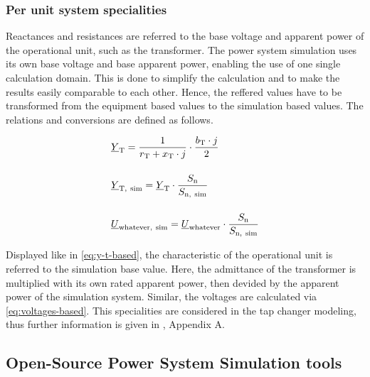 \subsubsection*{Per unit system specialities}

Reactances and resistances are referred to the base voltage and apparent power of the operational unit, such as the transformer. The power system simulation uses its own base voltage and base apparent power, enabling the use of one single calculation domain. This is done to simplify the calculation and to make the results easily comparable to each other. Hence, the reffered values have to be transformed from the equipment based values to the simulation based values. The relations and conversions are defined as follows.

\begin{align}
    &\underline{Y}_\mathrm{T}=\frac{1}{r_\mathrm{T} + x_\mathrm{T} \cdot j} \cdot \frac{b_\mathrm{T} \cdot j}{2} \notag \\[12pt]
    &\underline{Y}_\mathrm{T,~sim}=\underline{Y}_\mathrm{T} \cdot \frac{S_\mathrm{n}}{S_\mathrm{n,~sim}} \label{eq:y-t-based} \\[12pt]
    &\underline{U}_\mathrm{whatever,~sim}=\underline{U}_\mathrm{whatever} \cdot \frac{S_\mathrm{n}}{S_\mathrm{n,~sim}} \label{eq:voltages-based}
\end{align}

Displayed like in \autoref{eq:y-t-based}, the characteristic of the operational unit is referred to the simulation base value. Here, the admittance of the transformer is multiplied with its own rated apparent power, then devided by the apparent power of the simulation system. Similar, the voltages are calculated via \autoref{eq:voltages-based}. This specialities are considered in the tap changer modeling, thus further information is given in \autocite{machowskiPowerSystemDynamics2020}, Appendix A.


\subsection{Open-Source Power System Simulation tools}
    
